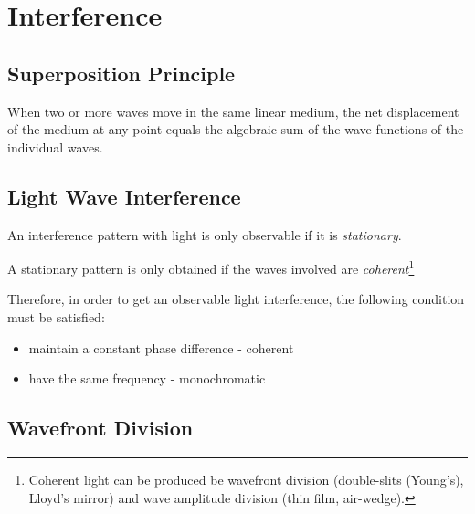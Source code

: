 \documentclass[UTF8]{book}
\begin{document}
\section{Interference}
\subsection{Superposition Principle}
When two or more waves move in the same linear medium, the net displacement of the medium at any point equals the algebraic sum of the wave functions of the individual waves.
\subsection{Light Wave Interference}
An interference pattern with light is only observable if it is \emph{stationary}.

A stationary pattern is only obtained if the
waves involved are \emph{coherent}\footnote{Coherent light can be produced be wavefront division (double-slits (Young’s), Lloyd’s mirror) and wave amplitude division (thin film, air-wedge).}

Therefore, in order to get an observable light interference, the following condition must be satisfied:
\begin{itemize}
\item maintain a constant phase difference - coherent
\item have the same frequency - monochromatic
\end{itemize}

\subsection{Wavefront Division}
\end{document}
